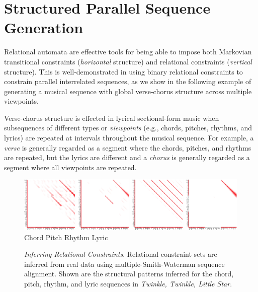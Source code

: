 \documentclass[phd,electronic,oneside,twosidetoc,letterpaper,chaptercenter,parttop,lol,lof,lot]{byumsphd}
\begin{document}
\section{Structured Parallel Sequence Generation}

{\sc Relational} automata are effective tools for being able to impose both Markovian transitional constraints (\emph{horizontal} structure) and relational constraints (\emph{vertical} structure). This is well-demonstrated in using binary relational constraints to constrain parallel interrelated sequences, as we show in the following example of generating a musical sequence with global verse-chorus structure across multiple viewpoints. 

Verse-chorus structure is effected in lyrical sectional-form music when subsequences of different types or \textit{viewpoints} (e.g., chords, pitches, rhythms, and lyrics) are repeated at intervals throughout the musical sequence. For example, a \textit{verse} is generally regarded as a segment where the chords, pitches, and rhythms are repeated, but the lyrics are different and a \textit{chorus} is generally regarded as a segment where all viewpoints are repeated.

\begin{figure}
    \centering
    \includegraphics[width=\linewidth]{structure}
     Chord \hspace{100pt} Pitch \hspace{100pt} Rhythm \hspace{100pt} Lyric
    \caption{\textit{Inferring Relational Constraints}. Relational constraint sets are inferred from real data using multiple-Smith-Waterman sequence alignment. Shown are the structural patterns inferred for the chord, pitch, rhythm, and lyric sequences in \emph{Twinkle, Twinkle, Little Star}.}
    \label{fig:structure}
\end{figure}
\end{document}
